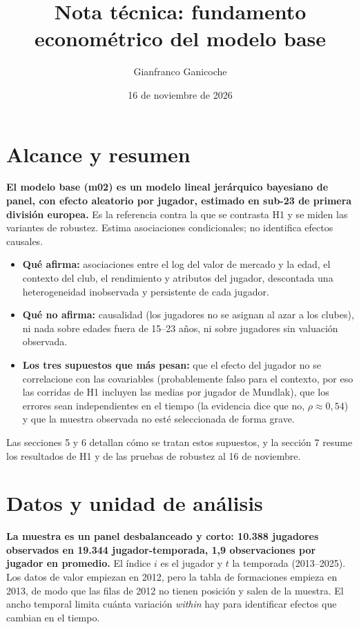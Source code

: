 \documentclass[11pt,a4paper]{article}
\title{Nota técnica: fundamento econométrico del modelo base}
\author{Gianfranco Ganicoche}
\date{16 de noviembre de 2026}
\newcommand{\lead}[1]{\textbf{#1}}
\begin{document}
\maketitle

\section{Alcance y resumen}

\lead{El modelo base (m02) es un modelo lineal jerárquico bayesiano de panel, con efecto aleatorio por jugador, estimado en sub-23 de primera división europea.} Es la referencia contra la que se contrasta H1 y se miden las variantes de robustez. Estima asociaciones condicionales; no identifica efectos causales.

\begin{itemize}
  \item \lead{Qué afirma:} asociaciones entre el log del valor de mercado y la edad, el contexto del club, el rendimiento y atributos del jugador, descontada una heterogeneidad inobservada y persistente de cada jugador.
  \item \lead{Qué no afirma:} causalidad (los jugadores no se asignan al azar a los clubes), ni nada sobre edades fuera de 15--23 años, ni sobre jugadores sin valuación observada.
  \item \lead{Los tres supuestos que más pesan:} que el efecto del jugador no se correlacione con las covariables (probablemente falso para el contexto, por eso las corridas de H1 incluyen las medias por jugador de Mundlak), que los errores sean independientes en el tiempo (la evidencia dice que no, $\rho \approx 0{,}54$) y que la muestra observada no esté seleccionada de forma grave.
\end{itemize}

Las secciones 5 y 6 detallan cómo se tratan estos supuestos, y la sección 7 resume los resultados de H1 y de las pruebas de robustez al 16 de noviembre.

\section{Datos y unidad de análisis}

\lead{La muestra es un panel desbalanceado y corto: 10.388 jugadores observados en 19.344 jugador-temporada, 1,9 observaciones por jugador en promedio.} El índice $i$ es el jugador y $t$ la temporada (2013--2025). Los datos de valor empiezan en 2012, pero la tabla de formaciones empieza en 2013, de modo que las filas de 2012 no tienen posición y salen de la muestra. El ancho temporal limita cuánta variación \emph{within} hay para identificar efectos que cambian en el tiempo.
\end{document}
